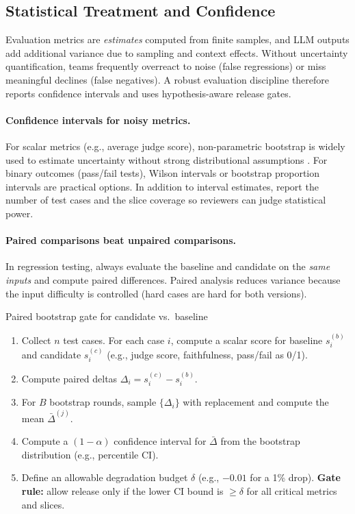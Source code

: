 \subsection{Statistical Treatment and Confidence}
\label{sec:ch10-statistical-confidence}
Evaluation metrics are \emph{estimates} computed from finite samples, and LLM outputs add additional variance due to sampling and context effects.
Without uncertainty quantification, teams frequently overreact to noise (false regressions) or miss meaningful declines (false negatives).
A robust evaluation discipline therefore reports confidence intervals and uses hypothesis-aware release gates.

\paragraph{Confidence intervals for noisy metrics.}
For scalar metrics (e.g., average judge score), non-parametric bootstrap is widely used to estimate uncertainty without strong distributional assumptions \cite{efron1994bootstrap}.
For binary outcomes (pass/fail tests), Wilson intervals or bootstrap proportion intervals are practical options.
In addition to interval estimates, report the number of test cases and the slice coverage so reviewers can judge statistical power.

\paragraph{Paired comparisons beat unpaired comparisons.}
In regression testing, always evaluate the baseline and candidate on the \emph{same inputs} and compute paired differences.
Paired analysis reduces variance because the input difficulty is controlled (hard cases are hard for both versions).

\begin{llmalgobox}{Paired bootstrap gate for candidate vs.\ baseline}
\label{alg:ch10_bootstrap_gate}
\begin{enumerate}[leftmargin=1.6em, itemsep=3pt]
    \item Collect $n$ test cases. For each case $i$, compute a scalar score for baseline $s^{(b)}_i$ and candidate $s^{(c)}_i$ (e.g., judge score, faithfulness, pass/fail as 0/1).
    \item Compute paired deltas $\Delta_i = s^{(c)}_i - s^{(b)}_i$.
    \item For $B$ bootstrap rounds, sample $\{\Delta_i\}$ with replacement and compute the mean $\bar{\Delta}^{(j)}$.
    \item Compute a $(1-\alpha)$ confidence interval for $\bar{\Delta}$ from the bootstrap distribution (e.g., percentile CI).
    \item Define an allowable degradation budget $\delta$ (e.g., $-0.01$ for a 1\% drop). \textbf{Gate rule:} allow release only if the lower CI bound is $\geq \delta$ for all critical metrics and slices.
\end{enumerate}
\end{llmalgobox}

